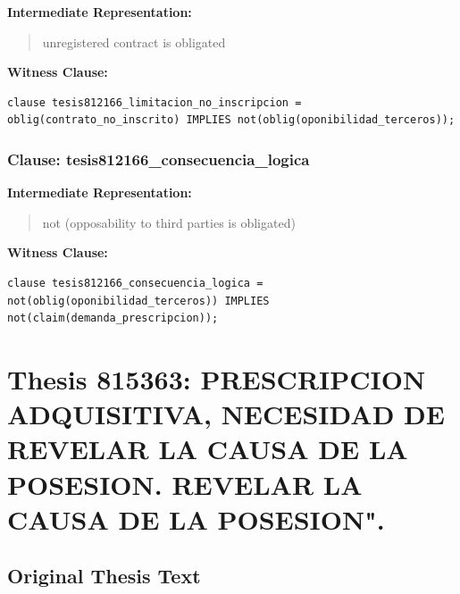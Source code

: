 \documentclass[11pt,a4paper]{article}
\begin{document}
\textbf{Intermediate Representation:}

\begin{quote}
unregistered contract is obligated
\end{quote}

\textbf{Witness Clause:}

\begin{lstlisting}[style=witnessstyle, language=Witness]
clause tesis812166_limitacion_no_inscripcion = oblig(contrato_no_inscrito) IMPLIES not(oblig(oponibilidad_terceros));
\end{lstlisting}

\subsubsection{Clause: tesis812166\_consecuencia\_logica}

\textbf{Intermediate Representation:}

\begin{quote}
not (opposability to third parties is obligated)
\end{quote}

\textbf{Witness Clause:}

\begin{lstlisting}[style=witnessstyle, language=Witness]
clause tesis812166_consecuencia_logica = not(oblig(oponibilidad_terceros)) IMPLIES not(claim(demanda_prescripcion));
\end{lstlisting}

\newpage

\section{Thesis 815363: PRESCRIPCION ADQUISITIVA, NECESIDAD DE REVELAR LA CAUSA DE LA POSESION. REVELAR LA CAUSA DE LA POSESION".}
\label{thesis:815363}

\subsection{Original Thesis Text}
\end{document}
